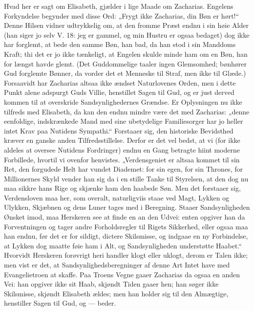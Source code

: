\documentclass[12pt,a4paper]{book}
\begin{document}
Hvad her er sagt om Elisabeth, gjælder i lige Maade om Zacharias.
Engelens Forkyndelse begynder med disse Ord: „Frygt ikke Zacharias, din
Bøn er hørt!“ Denne Hilsen vidner udtrykkelig om, at den fromme Præst
endnu i sin høie Alder (han siger jo selv V. 18: jeg er gammel, og min
Hustru er ogsaa bedaget) dog ikke har forglemt, at bede den samme Bøn,
han bad, da han stod i sin Manddoms Kraft; thi det er jo ikke tænkeligt,
at Engelen skulde minde ham om en Bøn, han for længst havde glemt. (Det
Guddommelige taaler ingen Glemsomhed; bønhører Gud forglemte Bønner, da
vorder det et Menneske til Straf, men ikke til Glæde.) Forsaavidt har
Zacharias altsaa ikke ændset Naturlovenes Orden, men i dette Punkt alene
adspurgt Guds Villie, henstillet Sagen til Gud, og er just derved kommen
til at overskride Sandsynlighedernes Grændse. Er Oplysningen nu ikke
tilfreds med Elisabeth, da kan den endnu mindre være det med Zacharias:
„denne eenfoldige, indskrænkede Mand med sine ubetydelige Familiesorger
har jo heller intet Krav paa Nutidens Sympathi.“ Forstaaer sig, den
historiske Bevidsthed kræver en ganske anden Tilfredsstillelse. Derfor er
det vel bedst, at vi (for ikke aldeles at oversee Nutidens Fordringer)
endnu en Gang betragte hiint moderne Forbillede, hvortil vi ovenfor
henvistes. „Verdensgeniet er altsaa kommet til sin Ret, den forgudede
Helt har vundet Diademet: for sin egen, for sin Thrones, for Millionernes
Skyld vender han sig da i en stille Tanke til Styrelsen, at den dog nu
maa sikkre hans Rige og skjænke ham den haabede Søn. Men det forstaaer
sig, Verdensloven maa her, som overalt, naturligviis staae ved Magt,
Lykken og Ulykken, Skjæbnen og dens Luner tages med i Beregning. Staaer
Sandsynligheden Ønsket imod, maa Herskeren see at finde en an\-%
den Udvei: enten opgiver han da Forventningen og tager andre
Forholdsregler til Rigets Sikkerhed, eller ogsaa maa han endnu, før det
er for sildigt, dictere Skilsmisse, og indgaae en ny Forbindelse, at
Lykken dog maatte føie ham i Alt, og Sandsynligheden understøtte
Haabet.“ Hvorvidt Herskeren forøvrigt heri handler klogt eller uklogt,
derom er Talen ikke; men vist er det, at Sandsynlighedsberegninger af
denne Art Intet have med Evangelietroen at skaffe. Paa Troens Vegne gaaer
Zacharias da ogsaa en anden Vei: han opgiver ikke sit Haab, skjøndt Tiden
gaaer hen; han søger ikke Skilsmisse, skjøndt Elisabeth ældes; men han
holder sig til den Almægtige, henstiller Sagen til Gud, og --- beder.
\end{document}
